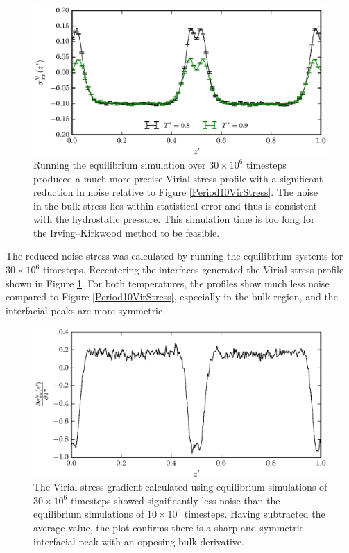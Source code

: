 \begin{figure}[h]
\centering
\includegraphics[scale=0.8]{Period30VirStress}
\caption{Running the equilibrium simulation over $30 \times 10^{6}$ timesteps produced a much more precise Virial stress profile with a significant reduction in noise relative to Figure \ref{Period10VirStress}.
The noise in the bulk stress lies within statistical error and thus is consistent with the hydrostatic pressure.
This simulation time is too long for the Irving--Kirkwood method to be feasible.
}
\label{Period30VirStress}
\end{figure}

The reduced noise stress was calculated by running the equilibrium systems for $30 \times 10^{6}$ timesteps.
Recentering the interfaces generated the Virial stress profile shown in Figure \ref{Period30VirStress}.
For both temperatures, the profiles show much less noise compared to Figure \ref{Period10VirStress}, especially in the bulk region, and the interfacial peaks are more symmetric.
\FloatBarrier

\begin{figure}[h]
\centering
\includegraphics[scale=0.8]{Period30VirForce}
\caption{The Virial stress gradient calculated using equilibrium simulations of $30 \times 10^{6}$ timesteps showed significantly less noise than the equilibrium simulations of $10 \times 10^{6}$ timesteps.
Having subtracted the average value, the plot confirms there is a sharp and symmetric interfacial peak with an opposing bulk derivative.
}
\label{Period30VirForce}
\end{figure}

